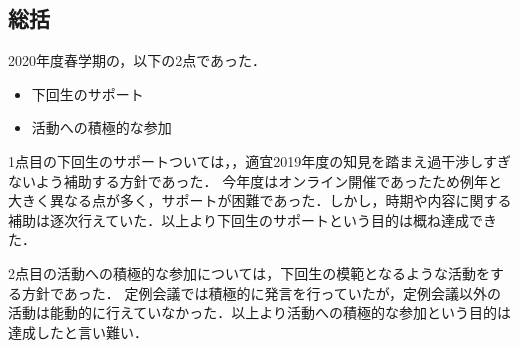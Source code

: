 \subsection*{\thirdGrade{}総括}


2020年度春学期の，以下の2点であった．
\begin{itemize}
\item 下回生のサポート
\item 活動への積極的な参加
\end{itemize}
\par 1点目の下回生のサポートついては，，適宜2019年度の知見を踏まえ過干渉しすぎないよう補助する方針であった．
今年度はオンライン開催であったため例年と大きく異なる点が多く，サポートが困難であった．しかし，時期や内容に関する補助は逐次行えていた．以上より下回生のサポートという目的は概ね達成できた．
\par 2点目の活動への積極的な参加については，下回生の模範となるような活動をする方針であった．
定例会議では積極的に発言を行っていたが，定例会議以外の活動は能動的に行えていなかった．以上より活動への積極的な参加という目的は達成したと言い難い．
